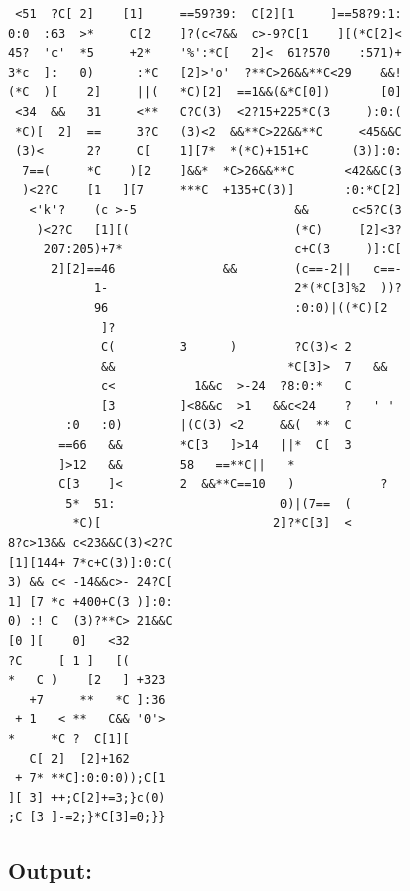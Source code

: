 \documentclass[11pt]{article}
\begin{document}
\begin{lstlisting}
 <51  ?C[ 2]    [1]     ==59?39:  C[2][1     ]==58?9:1:
0:0  :63  >*     C[2    ]?(c<7&&  c>-9?C[1    ][(*C[2]<
45?  'c'  *5     +2*    '%':*C[   2]<  61?570    :571)+
3*c  ]:   0)      :*C   [2]>'o'  ?**C>26&&**C<29    &&!
(*C  )[    2]     ||(   *C)[2]  ==1&&(&*C[0])       [0]
 <34  &&   31     <**   C?C(3)  <2?15+225*C(3     ):0:(
 *C)[  2]  ==     3?C   (3)<2  &&**C>22&&**C     <45&&C
 (3)<      2?     C[    1][7*  *(*C)+151+C      (3)]:0:
  7==(     *C    )[2    ]&&*  *C>26&&**C       <42&&C(3
  )<2?C    [1   ][7     ***C  +135+C(3)]       :0:*C[2]
   <'k'?    (c >-5                      &&      c<5?C(3
    )<2?C   [1][(                       (*C)     [2]<3?
     207:205)+7*                        c+C(3     )]:C[
      2][2]==46               &&        (c==-2||   c==-
            1-                          2*(*C[3]%2  ))?
            96                          :0:0)|((*C)[2
             ]?
             C(         3      )        ?C(3)< 2
             &&                        *C[3]>  7   &&
             c<           1&&c  >-24  ?8:0:*   C
             [3         ]<8&&c  >1   &&c<24    ?   ' '
        :0   :0)        |(C(3) <2     &&(  **  C
       ==66   &&        *C[3   ]>14   ||*  C[  3
       ]>12   &&        58   ==**C||   *
       C[3    ]<        2  &&**C==10   )            ?
        5*  51:                       0)|(7==  (
         *C)[                        2]?*C[3]  <
8?c>13&& c<23&&C(3)<2?C
[1][144+ 7*c+C(3)]:0:C(
3) && c< -14&&c>- 24?C[
1] [7 *c +400+C(3 )]:0:
0) :! C  (3)?**C> 21&&C
[0 ][    0]   <32
?C     [ 1 ]   [(
*   C )    [2   ] +323
   +7     **   *C ]:36
 + 1   < **   C&& '0'>
*     *C ?  C[1][
   C[ 2]  [2]+162
 + 7* **C]:0:0:0));C[1
][ 3] ++;C[2]+=3;}c(0)
;C [3 ]-=2;}*C[3]=0;}}

\end{lstlisting}

\subsection*{Output:}
\end{document}
